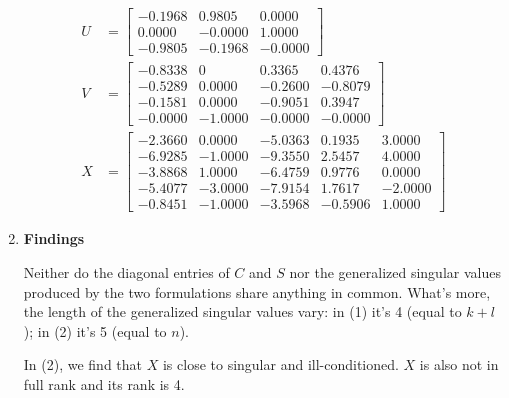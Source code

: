 \begin{enumerate}[(1).]
            \begin{align*}
                U &= \begin{bmatrix}
                   -0.1968 &  0.9805 &  0.0000 \\
                    0.0000 & -0.0000 &  1.0000 \\
                   -0.9805 & -0.1968 & -0.0000
                \end{bmatrix} 
                \\
                V &= \begin{bmatrix}
                   -0.8338  &       0 &   0.3365  &  0.4376 \\
                   -0.5289  &  0.0000 &  -0.2600  & -0.8079 \\
                   -0.1581  &  0.0000 &  -0.9051  &  0.3947 \\
                   -0.0000  & -1.0000 &  -0.0000  & -0.0000 
                \end{bmatrix} 
                \\ 
                X &= \begin{bmatrix}
                   -2.3660  &  0.0000 &  -5.0363  &  0.1935 &   3.0000 \\
                   -6.9285  & -1.0000 &  -9.3550  &  2.5457 &   4.0000 \\
                   -3.8868  &  1.0000 &  -6.4759  &  0.9776 &   0.0000 \\
                   -5.4077  & -3.0000 &  -7.9154  &  1.7617 &  -2.0000 \\
                   -0.8451  & -1.0000 &  -3.5968  & -0.5906 &   1.0000
                \end{bmatrix}
           \end{align*}
            
        \item \textbf{Findings}
        
        Neither do the diagonal entries of $C$ and $S$ nor the generalized singular values produced by the two formulations share anything in common. What's more, the length of the generalized singular values vary: in (1) it's 4 (equal to $k+l$); in (2) it's 5 (equal to $n$). 
        
        In (2), we find that $X$ is close to singular and ill-conditioned. $X$ is also not in full rank and its rank is 4.
    \end{enumerate}
    
    


